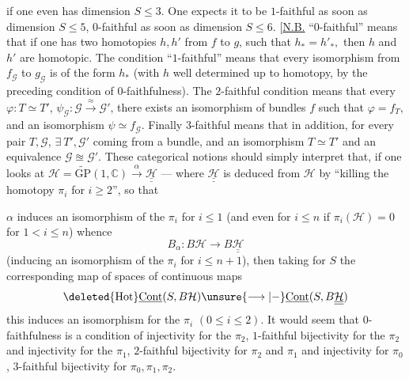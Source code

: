 if one even has dimension $S\leq3$. One expects it
to be $1$-faithful as soon as dimension $S\leq5$, $0$-faithful
as soon as dimension $S\leq6$.
[\uline{N.B.}  ``$0$-faithful'' means
that if  one has two homotopies $h,h'$ from $f$ to $g$,
such that $h_*=h'_*,$ then $h$ and $h'$ are homotopic.
The condition ``$1$-faithful'' means  that every
isomorphism from $f_{\mathcal G}$ to $g_{\mathcal G}$
 is of the
form $h_*$ (with $h$ well determined up to homotopy,
by the preceding condition of $0$-faithfulness). The
$2$-faithful condition means that  every
 $\varphi:T\simeq T'$,
$\psi_{\mathcal G}:\mathcal G\xrightarrow{\approx}\mathcal G'$,
there exists
an isomorphism of bundles $f$ such that $\varphi=f_T$,
and an isomorphism $\psi\simeq f_{\mathcal G}$. Finally $3$-faithful means
that in addition, for every pair $T,\mathcal G$,
$\exists\ T',\mathcal G'$ coming from a bundle, 
and an isomorphism $T\simeq T'$ and an equivalence
$\mathcal G\approxeq\mathcal G'$. These categorical notions
should simply interpret that, if
one looks at $\mathcal H=\widetilde{\mathrm{GP}}(1,\mathbb C)
\xrightarrow{\alpha}\underline{\underline{\mathcal H}}$
--- where $\underline{\underline{\mathcal H}}$
is deduced from $\mathcal H$ by ``killing the homotopy 
$\pi_i$ for $i\geq2$'', so that

$\alpha$ induces an isomorphism of the $\pi_i$ for $i\leq1$
(and even for $i\leq n$ if
$\pi_i(\mathcal H)=0$ for $1<i\leq n$)
 whence
\[
B_\alpha:B\mathcal H\longrightarrow B\underline{\underline{\mathcal H}}
\]
(inducing an isomorphism of the $\pi_i$ for $i\leq n+1$),
then taking for   $S$ the
corresponding map of spaces of continuous maps
\[
\deleted{\mathrm{Hot}}
\underline{\mathrm{Cont}}(S,B\mathcal H)
\unsure{\longrightarrow|{-}}
\underline{\mathrm{Cont}}(S,B\underline{\underline{\mathcal H}})
\]
this induces an isomorphism for the
$\pi_i$ $(0\leq i\leq2)$.  It would seem that
$0$-faithfulness is a condition of injectivity
for the $\pi_2$, $1$-faithful bijectivity for the
$\pi_2$ and injectivity for the $\pi_1$, $2$-faithful
bijectivity for $\pi_2$ and $\pi_1$ and injectivity
for $\pi_0$, $3$-faithful bijectivity for $\pi_0,\pi_1,\pi_2$.

